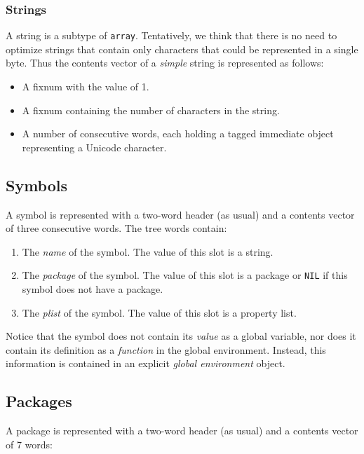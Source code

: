 \subsubsection{Strings}

A string is a subtype of \texttt{array}.  Tentatively, we think that
there is no need to optimize strings that contain only characters that
could be represented in a single byte.  Thus the contents vector of a
\emph{simple} string is represented as follows:

\begin{itemize}
\item A fixnum with the value of 1.
\item A fixnum containing the number of characters in the string.
\item A number of consecutive words, each holding a tagged immediate
  object representing a Unicode character.
\end{itemize}

\subsection{Symbols}

A symbol is represented with a two-word header (as usual) and a
contents vector of three consecutive words.  The tree words contain:

\begin{enumerate}
\item The \emph{name} of the symbol.  The value of this slot is a
  string.
\item The \emph{package} of the symbol.  The value of this slot is a
  package or \texttt{NIL} if this symbol does not have a package.
\item The \emph{plist} of the symbol.  The value of this slot is a
  property list.
\end{enumerate}

Notice that the symbol does not contain its \emph{value} as a global
variable, nor does it contain its definition as a \emph{function} in
the global environment.  Instead, this information is contained in an
explicit \emph{global environment} object.

\subsection{Packages}

A package is represented with a two-word header (as usual) and a
contents vector of 7 words:

